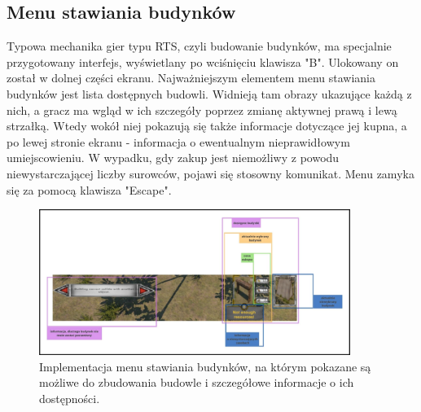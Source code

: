 \subsection{Menu stawiania budynków}
Typowa mechanika gier typu RTS, czyli budowanie budynków, ma specjalnie przygotowany interfejs, wyświetlany po wciśnięciu klawisza "B". 
Ulokowany on został w dolnej części ekranu. Najważniejszym elementem menu stawiania budynków jest lista dostępnych budowli. Widnieją tam 
obrazy ukazujące każdą z nich, a gracz ma wgląd w ich szczegóły poprzez zmianę aktywnej prawą i lewą strzałką. Wtedy wokół niej pokazują się także informacje dotyczące jej kupna,
a po lewej stronie ekranu - informacja o ewentualnym nieprawidłowym umiejscowieniu. W wypadku, gdy zakup jest niemożliwy z powodu niewystarczającej liczby 
surowców, pojawi się stosowny komunikat. Menu zamyka się za pomocą klawisza "Escape".
\begin{figure}[htbp]
    \centering
    \includegraphics[width=0.9\textwidth]{images/ui/opis_ekementow_budowanie.png}
    \caption{Implementacja menu stawiania budynków, na którym pokazane są możliwe do zbudowania budowle 
    i szczegółowe informacje o ich dostępności.
    }\label{fig:compass}
\end{figure}

